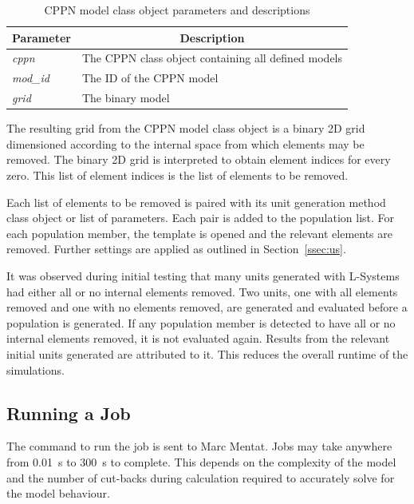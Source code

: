 \begin{table}[H]
\centering
\caption{CPPN model class object parameters and descriptions}
\label{tab:cpmodpardes}
\begin{tabular}{@{}ll@{}}
\toprule
\multicolumn{1}{c}{\textbf{Parameter}} & \multicolumn{1}{c}{\textbf{Description}}            \\ \midrule
\textit{cppn}                          & The CPPN class object containing all defined models \\
\textit{mod\_id}                       & The ID of the CPPN model                            \\
\textit{grid}                          & The binary model                                    \\ \bottomrule
\end{tabular}
\end{table}

The resulting grid from the CPPN model class object is a binary 2D grid dimensioned according to the internal space from which elements may be removed. The binary 2D grid is interpreted to obtain element indices for every zero. This list of element indices is the list of elements to be removed.

Each list of elements to be removed is paired with its unit generation method class object or list of parameters. Each pair is added to the population list. For each population member, the template is opened and the relevant elements are removed. Further settings are applied as outlined in Section~\ref{ssec:us}.

It was observed during initial testing that many units generated with L-Systems had either all or no internal elements removed. Two units, one with all elements removed and one with no elements removed, are generated and evaluated before a population is generated. If any population member is detected to have all or no internal elements removed, it is not evaluated again. Results from the relevant initial units generated are attributed to it. This reduces the overall runtime of the simulations.

\subsection{Running a Job}
\label{ssec:run}

The command to run the job is sent to Marc Mentat. Jobs may take anywhere from \SI{0.01}{\second} to \SI{300}{\second} to complete. This depends on the complexity of the model and the number of cut-backs during calculation required to accurately solve for the model behaviour.


